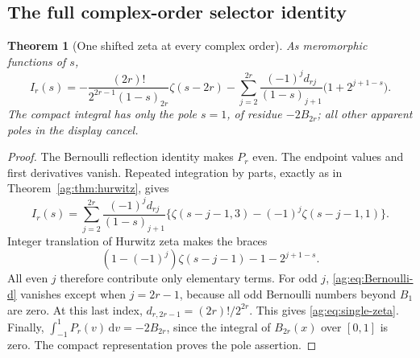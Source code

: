 \documentclass[11pt,letterpaper]{article}
\numberwithin{equation}{section}
\newtheorem{theorem}{Theorem}[section]
\theoremstyle{definition}\newtheorem{definition}[theorem]{Definition}
\theoremstyle{remark}\newtheorem{remark}[theorem]{Remark}
\newcommand{\dd}{\,\mathrm d}\newcommand{\ii}{\mathrm i}
\begin{document}
\subsection{The full complex-order selector identity}
\begin{theorem}[One shifted zeta at every complex order]
\label{ag:thm:single-zeta}
As meromorphic functions of $s$,
\begin{equation}\label{ag:eq:single-zeta}
 \boxed{
 I_r(s)=-\frac{(2r)!}{2^{2r-1}(1-s)_{2r}}\zeta(s-2r)
 -\sum_{j=2}^{2r}\frac{(-1)^jd_{rj}}{(1-s)_{j+1}}
                                    \bigl(1+2^{j+1-s}\bigr).}
\end{equation}
The compact integral has only the pole $s=1$, of residue $-2B_{2r}$;
all other apparent poles in the display cancel.
\end{theorem}
\begin{proof}
The Bernoulli reflection identity makes $P_r$ even. The endpoint values
and first derivatives vanish. Repeated integration by parts, exactly as
in Theorem~\ref{ag:thm:hurwitz}, gives
\[
 I_r(s)=\sum_{j=2}^{2r}\frac{(-1)^jd_{rj}}{(1-s)_{j+1}}
       \bigl\{\zeta(s-j-1,3)-(-1)^j\zeta(s-j-1,1)\bigr\}.
\]
Integer translation of Hurwitz zeta makes the braces
\[
 (1-(-1)^j)\zeta(s-j-1)-1-2^{j+1-s}.
\]
All even $j$ therefore contribute only elementary terms. For odd $j$,
\eqref{ag:eq:Bernoulli-d} vanishes except when $j=2r-1$, because all
odd Bernoulli numbers beyond $B_1$ are zero. At this last index,
$d_{r,2r-1}=(2r)!/2^{2r}$. This gives
\eqref{ag:eq:single-zeta}. Finally,
$\int_{-1}^1P_r(v)\dd v=-2B_{2r}$, since the integral of
$B_{2r}(x)$ over $[0,1]$ is zero. The compact representation proves the
pole assertion.
\end{proof}
\end{document}
